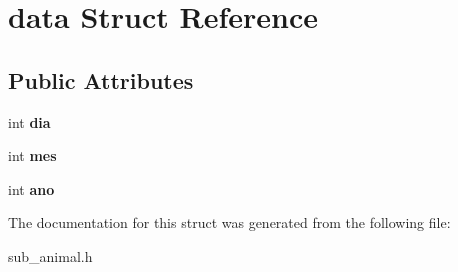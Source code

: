 \hypertarget{structdata}{}\section{data Struct Reference}
\label{structdata}
\subsection*{Public Attributes}
\begin{DoxyCompactItemize}
\item 
\mbox{\label{structdata_ac514ae966b758141957f8254bdd7850b}} 
int {\bfseries dia}
\item 
\mbox{\label{structdata_ad0f682acbc0199c05dc584f887f580a1}} 
int {\bfseries mes}
\item 
\mbox{\label{structdata_a2898507d44bff1cd51afb7dd562d2378}} 
int {\bfseries ano}
\end{DoxyCompactItemize}


The documentation for this struct was generated from the following file\+:\begin{DoxyCompactItemize}
\item 
sub\+\_\+animal.\+h\end{DoxyCompactItemize}
